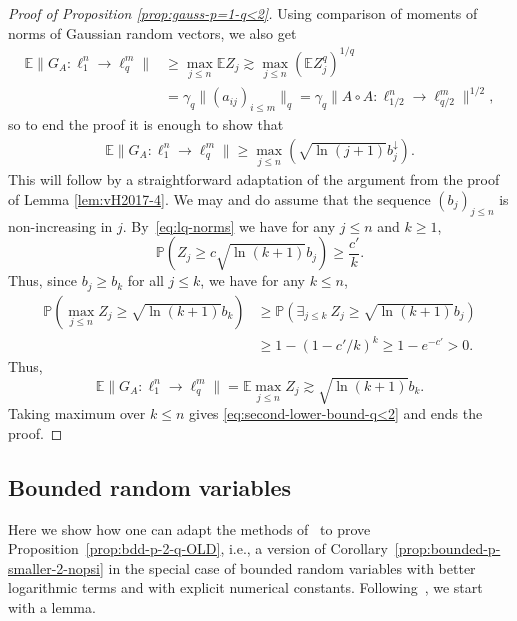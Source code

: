 \documentclass[a4paper]{amsart}
\theoremstyle{definition}
\theoremstyle{remark}
\numberwithin{equation}{section}
\newcommand*{\EE}{\mathbb{E}}
\newcommand*{\PP}{\mathbb{P}}
\newcommand*{\hadprod}{\mathbin{\circ}} %
\newcommand*{\rearr}{\downarrow} %
\begin{document}
\begin{proof}[Proof of Proposition \ref{prop:gauss-p=1-q<2}]
Using comparison of moments of norms of Gaussian random vectors, we also get
\begin{align}\label{eq:first-lower-bound-q<2}
\EE \|G_A \colon \ell_1^n \to \ell_q^m\| & \ge \max_{j\le n} \EE Z_j \gtrsim \max_{j\le n} (\EE Z_j^q)^{1/q} \nonumber \\
& = \gamma_q \|(a_{ij})_{i\le m}\|_q
  = \gamma_q \|A\hadprod A\colon \ell_{1/2}^n \to \ell_{q/2}^m\|^{1/2},
\end{align}
so to end the proof it is enough to show that
\begin{align}\label{eq:second-lower-bound-q<2}
\EE \|G_A \colon \ell_1^n \to \ell_q^m\| \ge \max_{j\le n}(\sqrt{\ln (j+1)}b_j^{\rearr{}}).
\end{align}
This will follow by a straightforward adaptation of the argument from the proof of Lemma \ref{lem:vH2017-4}. We may and do assume that the sequence $(b_j)_{j\leq n}$ is non-increasing in $j$. 
By~\eqref{eq:lq-norms} we have for any $j\le n$ and $k \ge 1$,
\begin{displaymath}
\PP(Z_j \ge c\sqrt{\ln(k+1)}b_j) \ge \frac{c'}{k}.
\end{displaymath}
Thus, since $b_j\geq b_k$ for all $j\le k$, we have for any $k\le n$,
\begin{align*}
\PP(\max_{j\le n} Z_j \ge \sqrt{\ln(k+1)}b_k ) & \geq \PP(\exists_{j\le k} \ Z_j \ge \sqrt{\ln(k+1)}b_j)\\
& \ge 1 - (1-c'/k)^k \ge 1- e^{-c'} > 0.
\end{align*}
Thus, 
\begin{displaymath}
  \EE \|G_A \colon \ell_1^n \to \ell_q^m\| = \EE \max_{j\le n} Z_j \gtrsim \sqrt{\ln(k+1)} b_k.
\end{displaymath}
Taking maximum over $k \le n$ gives \eqref{eq:second-lower-bound-q<2} and ends the proof.
\end{proof}


%
\subsection{Bounded random variables}
\label{sec:bdd-OLD}
%


Here we show how one can adapt the methods of~\cite{BGN}
to prove Proposition~\ref{prop:bdd-p-2-q-OLD}, i.e., a version of Corollary~\ref{prop:bounded-p-smaller-2-nopsi} in the special case of bounded random variables with better logarithmic terms and with  explicit numerical constants.
Following~\cite{BGN}, we start with a lemma.
\end{document}
